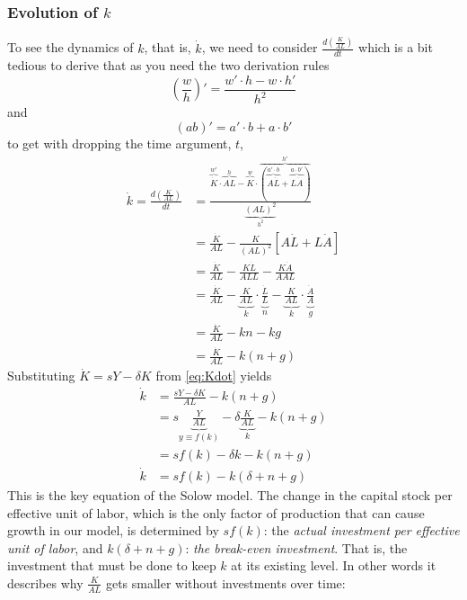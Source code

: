 \subsubsection{Evolution of $k$}
To see the dynamics of $k$, that is, $\dot{k}$, we need to consider $\frac{d \left(\frac{K}{AL}\right)}{d t}$ which is a bit tedious to derive that as you need the two derivation rules $$\left(\frac{w}{h}\right)'=\frac{w'\cdot h - w \cdot h'}{h^2}$$  and $$(ab)'=a'\cdot b + a \cdot b'$$ to get with dropping the time argument, $t$, 
\begin{align}
\dot{k}=	\frac{d \left(\frac{K}{AL}\right)}{d t} &= \frac{\overbrace{\dot{K}}^{w'} \cdot \overbrace{AL}^{h} - \overbrace{K}^{w} \cdot \overbrace{(\overbrace{A\dot{L}}^{a'\cdot b}+\overbrace{L\dot{A}}^{a\cdot b'})}^{h'}}{\underbrace{(AL)^2}_{h^2}}\\
	&=\frac{\dot{K}}{AL}-\frac{K}{(AL)^2} \left[A\dot{L}+L\dot{A}\right]\\
	&=\frac{\dot{K}}{AL}-\frac{K\dot{L}}{ALL}-\frac{K\dot{A}}{AAL}\\
	&=\frac{\dot{K}}{AL}-\underbrace{\frac{K}{AL}}_k\cdot \underbrace{\frac{\dot{L}}{L}}_n-\underbrace{\frac{K}{AL}}_k\cdot \underbrace{\frac{\dot{A}}{A}}_g	\\
	&=\frac{\dot{K}}{AL}-kn-kg\\
	&=\frac{\dot{K}}{AL}-k(n+g)
\end{align}
Substituting $\dot{K}=sY-\delta K$ from \autoref{eq:Kdot} yields
\begin{align}
	\dot{k}&=\frac{sY-\delta K}{AL}-k(n+g)\\
	&=s\underbrace{\frac{Y}{AL}}_{y\equiv f(k)}-\delta\underbrace{\frac{K}{AL}}_k-k(n+g)\\
	&=sf(k)-\delta k-k(n+g)\\
		\dot{k}&=sf(k)-k(\delta + n+g)
\end{align}
This is the key equation of the Solow model. The change in the capital stock per effective unit of labor, which is the only factor of production that can cause growth in our model, is determined by $sf(k)$: the \textit{actual investment per effective unit of labor}, and $k(\delta + n+g)$: \textit{the break-even investment}. That is, the investment that must be done to keep $k$ at its existing level. In other words it describes why $\frac{K}{AL}$ gets smaller without investments over time:

